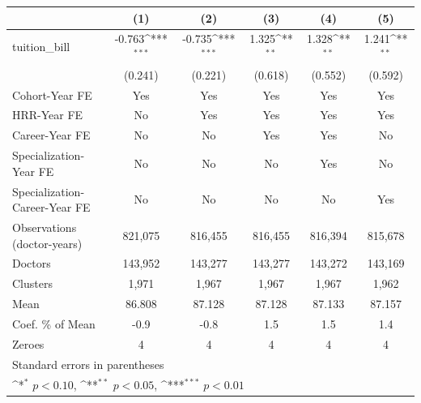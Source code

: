 {
\def\sym#1{\ifmmode^{#1}\else\(^{#1}\)\fi}
\begin{tabular}{l*{5}{c}}
\hline\hline
                    &\multicolumn{1}{c}{(1)}         &\multicolumn{1}{c}{(2)}         &\multicolumn{1}{c}{(3)}         &\multicolumn{1}{c}{(4)}         &\multicolumn{1}{c}{(5)}         \\
\hline
tuition\_bill        &      -0.763\sym{***}&      -0.735\sym{***}&       1.325\sym{**} &       1.328\sym{**} &       1.241\sym{**} \\
                    &     (0.241)         &     (0.221)         &     (0.618)         &     (0.552)         &     (0.592)         \\
[1em]
Cohort-Year FE      &         Yes         &         Yes         &         Yes         &         Yes         &         Yes         \\
[1em]
HRR-Year FE         &          No         &         Yes         &         Yes         &         Yes         &         Yes         \\
[1em]
Career-Year FE      &          No         &          No         &         Yes         &         Yes         &          No         \\
[1em]
Specialization-Year FE&          No         &          No         &          No         &         Yes         &          No         \\
[1em]
Specialization-Career-Year FE&          No         &          No         &          No         &          No         &         Yes         \\
\hline
Observations (doctor-years)&     821,075         &     816,455         &     816,455         &     816,394         &     815,678         \\
Doctors             &     143,952         &     143,277         &     143,277         &     143,272         &     143,169         \\
Clusters            &       1,971         &       1,967         &       1,967         &       1,967         &       1,962         \\
Mean                &      86.808         &      87.128         &      87.128         &      87.133         &      87.157         \\
Coef. \% of Mean    &        -0.9         &        -0.8         &         1.5         &         1.5         &         1.4         \\
Zeroes              &           4         &           4         &           4         &           4         &           4         \\
\hline\hline
\multicolumn{6}{l}{\footnotesize Standard errors in parentheses}\\
\multicolumn{6}{l}{\footnotesize \sym{*} \(p<0.10\), \sym{**} \(p<0.05\), \sym{***} \(p<0.01\)}\\
\end{tabular}
}
